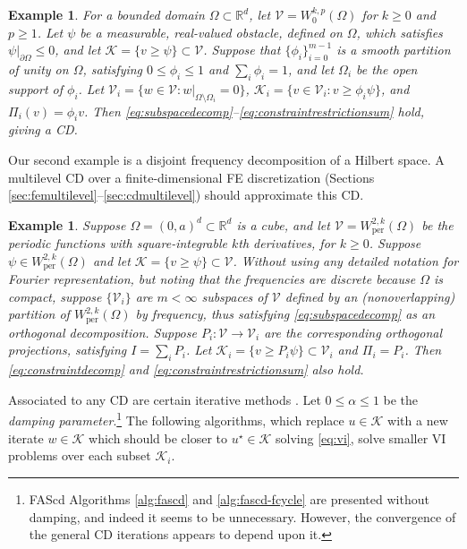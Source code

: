 \documentclass[letterpaper,final,12pt,reqno]{amsart}
\theoremstyle{cstyle}
\theoremstyle{cstyle*}
\theoremstyle{dstyle}
\newtheorem{example}[theorem]{Example}
\numberwithin{equation}{section}
\numberwithin{figure}{section}
\numberwithin{table}{section}
\numberwithin{theorem}{section}
\newcommand{\RR}{\mathbb{R}}
\newcommand{\cK}{\mathcal{K}}
\newcommand{\cV}{\mathcal{V}}
\begin{document}
\begin{example}  \label{ex:domaindecomposition}  For a bounded domain $\Omega \subset \RR^d$, let $\cV = W_0^{k,p}(\Omega)$ for $k\ge 0$ and $p\ge 1$.  Let $\psi$ be a measurable, real-valued obstacle, defined on $\Omega$, which satisfies $\psi|_{\partial \Omega} \le 0$, and let $\cK = \{v \ge \psi\} \subset \cV$.  Suppose that $\{\phi_i\}_{i=0}^{m-1}$ is a smooth partition of unity on $\Omega$, satisfying $0 \le \phi_i\le 1$ and $\sum_i \phi_i = 1$, and let $\Omega_i$ be the open support of $\phi_i$.  Let $\cV_i = \{w \in \cV:w|_{\Omega \setminus \Omega_i} =0 \}$, $\cK_i = \{v \in \cV_i: v \ge \phi_i \psi\}$, and $\Pi_i(v) = \phi_i v$.  Then \eqref{eq:subspacedecomp}--\eqref{eq:constraintrestrictionsum} hold, giving a CD.
\end{example}

Our second example is a disjoint frequency decomposition of a Hilbert space.  A multilevel CD over a finite-dimensional FE discretization (Sections \ref{sec:femultilevel}--\ref{sec:cdmultilevel}) should approximate this CD.

\begin{example}  \label{ex:frequencydecomposition}  Suppose $\Omega = (0,a)^d \subset \RR^d$ is a cube, and let $\cV = W_{\text{per}}^{2,k}(\Omega)$ be the periodic functions with square-integrable $k$th derivatives, for $k \ge 0$.  Suppose $\psi \in W_{\text{per}}^{2,k}(\Omega)$ and let $\cK = \{v \ge \psi\} \subset \cV$.  Without using any detailed notation for Fourier representation, but noting that the frequencies are discrete because $\Omega$ is compact, suppose $\{\cV_i\}$ are $m<\infty$ subspaces of $\cV$ defined by an (nonoverlapping) partition of $W_{\text{per}}^{2,k}(\Omega)$ by frequency, thus satisfying \eqref{eq:subspacedecomp} as an orthogonal decomposition.  Suppose $P_i:\cV \to \cV_i$ are the corresponding orthogonal projections, satisfying $I = \sum_i P_i$.  Let $\cK_i = \{v \ge P_i \psi\} \subset \cV_i$ and $\Pi_i = P_i$.  Then \eqref{eq:constraintdecomp} and \eqref{eq:constraintrestrictionsum} also hold.
\end{example}

Associated to any CD are certain iterative methods \cite{Tai2003,Xu1992}.  Let $0\le \alpha \le 1$ be the \emph{damping parameter}.\footnote{FAScd Algorithms \ref{alg:fascd} and \ref{alg:fascd-fcycle} are presented without damping, and indeed it seems to be unnecessary.  However, the convergence of the general CD iterations appears to depend upon it.}  The following algorithms, which replace $u \in \cK$ with a new iterate $w\in\cK$ which should be closer to $u^\star \in \cK$ solving \eqref{eq:vi}, solve smaller VI problems over each subset $\cK_i$.
\end{document}

